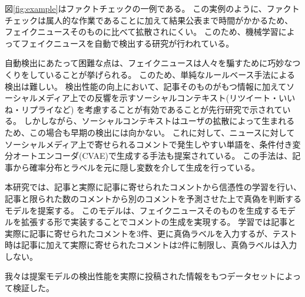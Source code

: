 図\ref{fig:example}はファクトチェックの一例である\cite{gillin_2017}。
この実例のように、ファクトチェックは属人的な作業であることに加えて結果公表まで時間がかかるため、
フェイクニュースそのものに比べて拡散されにくい。
このため、機械学習によってフェイクニュースを自動で検出する研究が行われている。

自動検出にあたって困難な点は、フェイクニュースは人々を騙すために巧妙なつくりをしていることが挙げられる。
このため、単純なルールベース手法による検出は難しい。
検出性能の向上において、記事そのものがもつ情報に加えてソーシャルメディア上での反響を示すソーシャルコンテキスト(リツイート・いいね・リプライなど)
を考慮することが有効であることが先行研究で示されている\cite{Guo:2018:RDH:3269206.3271709}。
しかしながら、ソーシャルコンテキストはユーザの拡散によって生まれるため、この場合も早期の検出には向かない。
これに対して、ニュースに対してソーシャルメディア上で寄せられるコメントで発生しやすい単語を、条件付き変分オートエンコーダ(CVAE)で生成する手法も提案されている\cite{ijcai2018-533}。
この手法は、記事から確率分布とラベルを元に隠し変数を介して生成を行っている。

本研究では、記事と実際に記事に寄せられたコメントから信憑性の学習を行い、記事と限られた数のコメントから別のコメントを予測させた上で真偽を判断するモデルを提案する。
このモデルは、フェイクニュースそのものを生成するモデル\cite{NIPS2019_9106}を拡張する形で実装することでコメントの生成を実現する。
学習では記事と実際に記事に寄せられたコメントを3件、更に真偽ラベルを入力するが、テスト時は記事に加えて実際に寄せられたコメントは2件に制限し、真偽ラベルは入力しない。

我々は提案モデルの検出性能を実際に投稿された情報をもつデータセットによって検証した。
